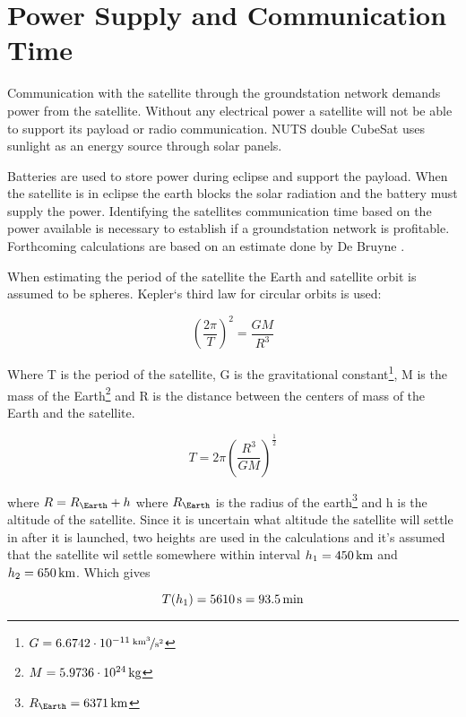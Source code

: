 \section{Power Supply and Communication Time}

Communication with the satellite through the groundstation network demands power from the satellite. Without any electrical power a satellite will not be able to support its payload or radio communication. NUTS double CubeSat uses sunlight as an energy source through solar panels. 

Batteries are used to store power during eclipse and support the payload. When the satellite is in eclipse the earth blocks the solar radiation and the battery must supply the power. Identifying the satellites communication time based on the power available is necessary to establish if a groundstation network is profitable. Forthcoming calculations are based on an estimate done by De Bruyne \cite{Satellite Power Systems}.

When estimating the period of the satellite the Earth and satellite orbit is assumed to be spheres. Kepler`s third law for circular orbits is used:

\begin{equation}
\left(\frac{2\pi}{T}\right)^2 = \frac{GM}{R^3}
\label{eq:Keplers_3}
\end{equation}

Where T is the period of the satellite, G is the gravitational constant\footnote{$G=\unitfrac[6.6742\cdot 10^{-11}]{km^3}{s^2}$}, M is the mass of the Earth\footnote{$M=\unit[5.9736\cdot 10^{24}]{kg}$} and R is the distance between the centers of mass of the Earth and the satellite.

\begin{equation}
T = 2\pi \left(\frac{R^3}{GM}\right)^{\frac{1}{2}}
\label{eq:satellite_period}
\end{equation}

where $R = R_\Earth + h$ where $R_\Earth$ is the radius of the earth\footnote{$R_\Earth = \unit[6371]{km}$} and h is the altitude of the satellite. 
Since it is uncertain what altitude the satellite will settle in after it is launched, two heights are used in the calculations and it's assumed that the satellite wil settle somewhere within interval $h_1=\unit[450]{km}$ and $h_2=\unit[650]{km}$. 
Which gives

\begin{equation}
T(h_1) = \unit[5610]{s} = \unit[93.5]{min}
\end{equation}


